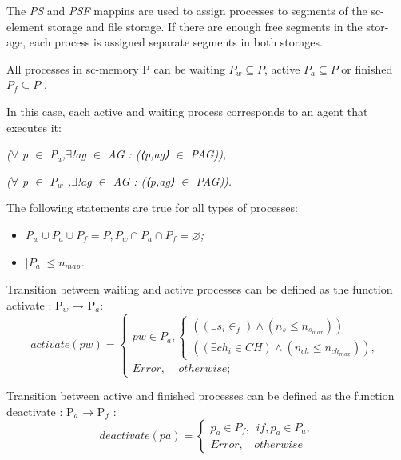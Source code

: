\documentclass[10pt, a4paper]{article}
\begin{document}
\begin{multicols}{2}
The \textit{PS} and \textit{PSF} mappins are used to assign processes to segments of the sc-element storage and file storage. If there are enough free segments in the stor- age, each process is assigned separate segments in both storages.

All processes in sc-memory P can be waiting $P_{w} \subseteq P$, active $P_{a}\subseteq P$ or finished $P_{f} \subseteq P$ .

In this case, each active and waiting process corresponds to an agent that executes it:
\begin{center}
    \textit{($\forall$ p  $\in$ P$_{a}$,$\exists$!ag $\in$ AG : (⟨p,ag⟩ $\in$ PAG)),}
    
    \textit{($\forall$  p  $\in$ P$_{w}$ ,$\exists$!ag $\in$ AG : (⟨p,ag⟩ $\in$ PAG)).}
\end{center}

The following statements are true for all types of
processes:
\begin{itemize}
\setlength{\parskip}{0pt}
\setlength{\itemsep}{0pt}
    \item \textit{P$_{w} \cup P_{a} \cup P_{f} =P,P_{w} \cap P_{a} \cap P_{f} = \varnothing$;}
    
    \item \textit{$|P_{a}| \leq n_{map}$.}
\end{itemize}

Transition between waiting and active processes can
be defined as the function activate : P$_{w}$ → P$_{a}$:
\begin{equation*}
activate(pw) =
 \begin{cases}
 pw \in  P_{a}, 
                \begin{cases}
                ((\exists s_{i} \in  _{f}) \land (n_{s} \leq n_{s_{max}}))
                \\
                ((\exists ch_{i} \in CH) \land (n_{ch} \leq n_{ch_{max}})),
                \end{cases}
               

\\
 Error, \ \ \ \ \ otherwise;
 \end{cases}
\end{equation*}

Transition between active and finished processes can
be defined as the function deactivate : P$_{a}$ → P$_{f}$ :
\begin{equation*}
deactivate(pa) = 
 \begin{cases}
    p_{a} \in P_{f},\ \  if, p_{a} \in P_{a},
   \\
   Error, \ \ \ \ otherwise
 \end{cases}
\end{equation*}


\end{multicols}
\end{document}

